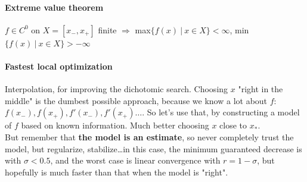 \documentclass[10pt]{report}
\begin{document}
\paragraph{Extreme value theorem} $f \in C^0$ on $X = [x_-, x_+]$ finite $\Rightarrow$ max$\{f(x)\:|\: x\in X\} < \infty$, min$\{f(x)\:|\: x\in X\} > -\infty$
\paragraph{Fastest local optimization} Interpolation, for improving the dichotomic search. Choosing $x$ "right in the middle" is the dumbest possible approach, because we know a lot about $f$: $f(x_-), f(x_+), f'(x_-), f'(x_+)\ldots$. So let's use that, by constructing a model of $f$ based on known information. Much better choosing $x$ close to $x_*$.\\
But remember that \textbf{the model is an estimate}, so never completely trust the model, but regularize, stabilize\ldots in this case, the minimum guaranteed decrease is with $\sigma < 0.5$, and the worst case is linear convergence with $r = 1 - \sigma$, but hopefully is much faster than that when the model is "right".
\end{document}
